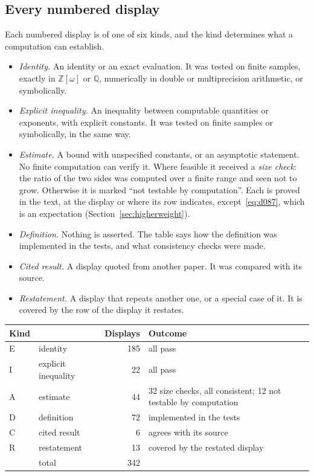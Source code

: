 \documentclass[11pt]{article}
\numberwithin{equation}{section}
\newcommand{\OO}{\mathbb Z[\omega]}
\begin{document}
\subsection{Every numbered display}\label{sec:numerics-displays}

Each numbered display is of one of six kinds, and the kind determines what a computation can establish.
\begin{itemize}
\item[E] \emph{Identity.} An identity or an exact evaluation. It was tested on finite samples, exactly in $\OO$ or
 $\mathbb Q$, numerically in double or multiprecision arithmetic, or symbolically.
\item[I] \emph{Explicit inequality.} An inequality between computable quantities or exponents, with explicit
 constants. It was tested on finite samples or symbolically, in the same way.
\item[A] \emph{Estimate.} A bound with unspecified constants, or an asymptotic statement. No finite computation can
 verify it. Where feasible it received a \emph{size check}: the ratio of the two sides was computed over a finite
 range and seen not to grow. Otherwise it is marked ``not testable by computation''. Each is proved in the text, at the display or where its
 row indicates, except~\eqref{eq:d087}, which is an expectation (Section~\ref{sec:higherweight}).
\item[D] \emph{Definition.} Nothing is asserted. The table says how the definition was implemented in the tests,
 and what consistency checks were made.
\item[C] \emph{Cited result.} A display quoted from another paper. It was compared with its source.
\item[R] \emph{Restatement.} A display that repeats another one, or a special case of it. It is covered by the
 row of the display it restates.
\end{itemize}

\begin{center}
\small
\begin{tabular}{@{}llrl@{}}
\toprule
Kind & & Displays & Outcome\\\midrule
E & identity & 185 & all pass\\
I & explicit inequality & 22 & all pass\\
A & estimate & 44 & 32 size checks, all consistent; 12 not testable by computation\\
D & definition & 72 & implemented in the tests\\
C & cited result & 6 & agrees with its source\\
R & restatement & 13 & covered by the restated display\\\midrule
 & total & 342 & \\\bottomrule
\end{tabular}
\end{center}
\end{document}
